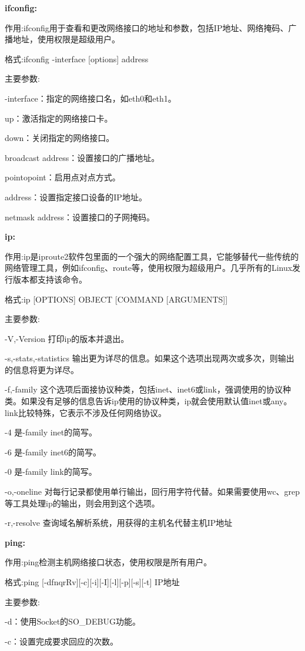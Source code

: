 \textbf{ifconfig:}

作用:ifconfig用于查看和更改网络接口的地址和参数，包括IP地址、网络掩码、广播地址，使用权限是超级用户。

格式:ifconfig -interface [options] address

主要参数:

-interface：指定的网络接口名，如eth0和eth1。

up：激活指定的网络接口卡。

down：关闭指定的网络接口。

broadcast address：设置接口的广播地址。

pointopoint：启用点对点方式。

address：设置指定接口设备的IP地址。

netmask address：设置接口的子网掩码。

\textbf{ip:}

作用:ip是iproute2软件包里面的一个强大的网络配置工具，它能够替代一些传统的网络管理工具，例如ifconfig、route等，使用权限为超级用户。几乎所有的Linux发行版本都支持该命令。

格式:ip [OPTIONS] OBJECT [COMMAND [ARGUMENTS]]

主要参数:

-V,-Version 打印ip的版本并退出。

-s,-stats,-statistics 输出更为详尽的信息。如果这个选项出现两次或多次，则输出的信息将更为详尽。

-f,-family 这个选项后面接协议种类，包括inet、inet6或link，强调使用的协议种类。如果没有足够的信息告诉ip使用的协议种类，ip就会使用默认值inet或any。link比较特殊，它表示不涉及任何网络协议。

-4 是-family inet的简写。

-6 是-family inet6的简写。

-0 是-family link的简写。

-o,-oneline 对每行记录都使用单行输出，回行用字符代替。如果需要使用wc、grep等工具处理ip的输出，则会用到这个选项。

-r,-resolve 查询域名解析系统，用获得的主机名代替主机IP地址

\textbf{ping:}

作用:ping检测主机网络接口状态，使用权限是所有用户。

格式:ping [-dfnqrRv][-c][-i][-I][-l][-p][-s][-t] IP地址

主要参数:

-d：使用Socket的SO\_DEBUG功能。

-c：设置完成要求回应的次数。


